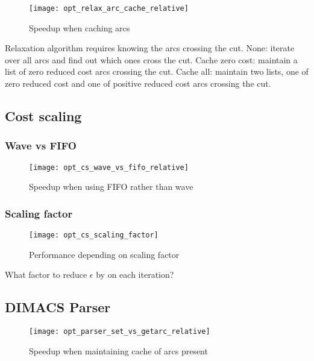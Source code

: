 \begin{figure}
    \centering
    \texttt{[image: opt\_relax\_arc\_cache\_relative]}
    \caption{Speedup when caching arcs}
    \label{fig:opt-relax-cache-arcs}
\end{figure}

Relaxation algorithm requires knowing the arcs crossing the cut. None: iterate over all arcs and find out which ones cross the cut. Cache zero cost: maintain a list of zero reduced cost arcs crossing the cut. Cache all: maintain two lists, one of zero reduced cost and one of positive reduced cost arcs crossing the cut.

\subsection{Cost scaling}

\subsubsection{Wave vs FIFO}

\begin{figure}
    \centering
    \texttt{[image: opt\_cs\_wave\_vs\_fifo\_relative]}
    \caption{Speedup when using FIFO rather than wave}
    \label{fig:opt-cs-wave-vs-fifo}
\end{figure}


\subsubsection{Scaling factor}

\begin{figure}
    \centering
    \texttt{[image: opt\_cs\_scaling\_factor]}
    \caption{Performance depending on scaling factor}
    \label{fig:opt-cs-scaling-factor}
\end{figure}

What factor to reduce $\epsilon$ by on each iteration?

\subsection{DIMACS Parser}

\begin{figure}
    \centering
    \texttt{[image: opt\_parser\_set\_vs\_getarc\_relative]}
    \caption{Speedup when maintaining cache of arcs present}
    \label{fig:opt-dimacs-parser}
\end{figure}

